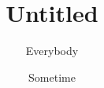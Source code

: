 \documentclass{article}
\begin{document}
\title{Untitled}
\author{Everybody}
\date{Sometime}
\maketitle
\end{document}
